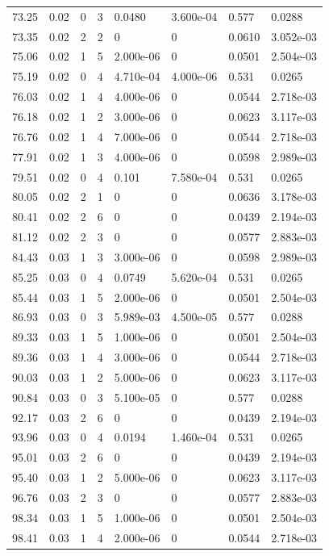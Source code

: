 \documentclass[preview]{standalone}
\begin{document}
{{{\begin{tabular}{L{1.2cm}C{1.2cm} C{0.3cm}C{0.5cm} C{1.4cm}C{1.4cm} C{1.4cm}C{1.4cm}}
  73.25  &  0.02  & 0     &  3 &  0.0480  & 3.600e-04  & 0.577 &  0.0288   \\ 
  73.35  &  0.02  & 2     &  2 &  0  & 0  & 0.0610 &  3.052e-03   \\ 
  75.06  &  0.02  & 1     &  5 &  2.000e-06  & 0  & 0.0501 &  2.504e-03   \\ 
  75.19  &  0.02  & 0     &  4 &  4.710e-04  & 4.000e-06  & 0.531 &  0.0265   \\ 
  76.03  &  0.02  & 1     &  4 &  4.000e-06  & 0  & 0.0544 &  2.718e-03   \\ 
  76.18  &  0.02  & 1     &  2 &  3.000e-06  & 0  & 0.0623 &  3.117e-03   \\ 
  76.76  &  0.02  & 1     &  4 &  7.000e-06  & 0  & 0.0544 &  2.718e-03   \\ 
  77.91  &  0.02  & 1     &  3 &  4.000e-06  & 0  & 0.0598 &  2.989e-03   \\ 
  79.51  &  0.02  & 0     &  4 &  0.101  & 7.580e-04  & 0.531 &  0.0265   \\ 
  80.05  &  0.02  & 2     &  1 &  0  & 0  & 0.0636 &  3.178e-03   \\ 
  80.41  &  0.02  & 2     &  6 &  0  & 0  & 0.0439 &  2.194e-03   \\ 
  81.12  &  0.02  & 2     &  3 &  0  & 0  & 0.0577 &  2.883e-03   \\ 
  84.43  &  0.03  & 1     &  3 &  3.000e-06  & 0  & 0.0598 &  2.989e-03   \\ 
  85.25  &  0.03  & 0     &  4 &  0.0749  & 5.620e-04  & 0.531 &  0.0265   \\ 
  85.44  &  0.03  & 1     &  5 &  2.000e-06  & 0  & 0.0501 &  2.504e-03   \\ 
  86.93  &  0.03  & 0     &  3 &  5.989e-03  & 4.500e-05  & 0.577 &  0.0288   \\ 
  89.33  &  0.03  & 1     &  5 &  1.000e-06  & 0  & 0.0501 &  2.504e-03   \\ 
  89.36  &  0.03  & 1     &  4 &  3.000e-06  & 0  & 0.0544 &  2.718e-03   \\ 
  90.03  &  0.03  & 1     &  2 &  5.000e-06  & 0  & 0.0623 &  3.117e-03   \\ 
  90.84  &  0.03  & 0     &  3 &  5.100e-05  & 0  & 0.577 &  0.0288   \\ 
  92.17  &  0.03  & 2     &  6 &  0  & 0  & 0.0439 &  2.194e-03   \\ 
  93.96  &  0.03  & 0     &  4 &  0.0194  & 1.460e-04  & 0.531 &  0.0265   \\ 
  95.01  &  0.03  & 2     &  6 &  0  & 0  & 0.0439 &  2.194e-03   \\ 
  95.40  &  0.03  & 1     &  2 &  5.000e-06  & 0  & 0.0623 &  3.117e-03   \\ 
  96.76  &  0.03  & 2     &  3 &  0  & 0  & 0.0577 &  2.883e-03   \\ 
  98.34  &  0.03  & 1     &  5 &  1.000e-06  & 0  & 0.0501 &  2.504e-03   \\ 
  98.41  &  0.03  & 1     &  4 &  2.000e-06  & 0  & 0.0544 &  2.718e-03   \\ 
\hline 
\end{tabular} 

}}}
\end{document}
